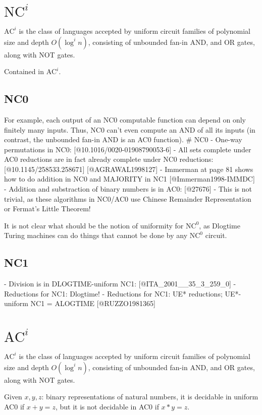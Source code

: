 \section{\texorpdfstring{$\text{NC}^i$}{NC\string^i}}
$\text{AC}^i$ is the class of languages accepted by uniform circuit
families of polynomial size and depth $O(\log^i n)$, consisting of unbounded fan-in
AND, and OR gates, along with NOT gates.

Contained in $\text{AC}^i$.

\subsection{NC0}
For example, each output of an NC0 computable function can depend on only finitely many
inputs. Thus, NC0 can't even compute an AND of all its inputs (in contrast, the unbounded
fan-in AND is an AC0 function).
# NC0
- One-way permutations in NC0: [@10.1016/0020-01908790053-6]
- All sets complete under AC0 reductions are in fact already complete under NC0 reductions: [@10.1145/258533.258671] [@AGRAWAL1998127]
- Immerman at page 81 shows how to do addition in NC0 and MAJORITY in NC1 [@Immerman1998-IMMDC]
- Addition and substraction of binary numbers is in AC0: [@27676]
- This is not trivial, as these algorithms in NC0/AC0 use Chinese Remainder Representation or Fermat's Little Theorem!



It is not clear what should be the notion of uniformity for $\text{NC}^0$,
as Dlogtime Turing machines can do things that cannot be done by
any $\text{NC}^0$ circuit.
\subsection{NC1}
- Division is in DLOGTIME-uniform NC1: [@ITA_2001__35_3_259_0]
- Reductions for NC1: Dlogtime!
- Reductions for NC1: UE* reductions; UE*-uniform NC1 = ALOGTIME [@RUZZO1981365]


\section{\texorpdfstring{$\text{AC}^i$}{AC\string^i}}
$\text{AC}^i$ is the class of languages accepted by uniform circuit
families of polynomial size and depth $O(\log^i n)$, consisting of unbounded fan-in
AND, and OR gates, along with NOT gates.

Given $x, y, z$: binary representations of natural numbers,
it is decidable in uniform AC0 if $x + y = z$, but it is not decidable 
in AC0 if $x * y = z$.

